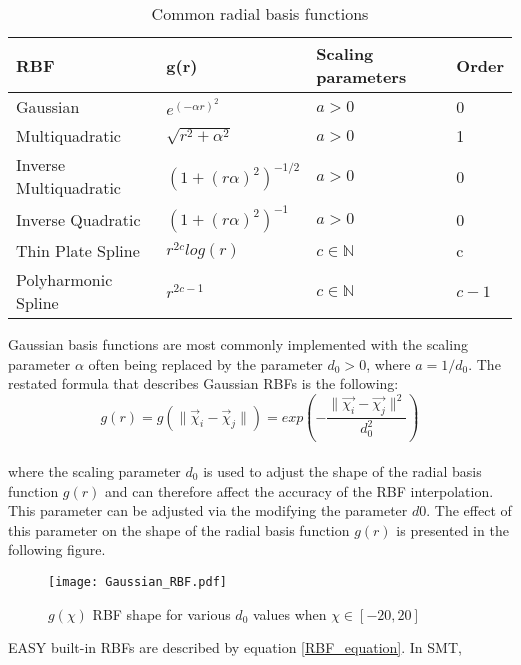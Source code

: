 \begin{table}[h!]
\centering
\begin{tabular}[c]{|p{4.1cm}|p{2.5cm}|p{2.5cm}|p{2.5cm}|}
\toprule
\rowcolor{gray!20} \textbf{RBF} & \textbf{g(r)} & 
\textbf{Scaling parameters}
& \textbf{Order} \\
\midrule
Gaussian & $e^{(-αr)^{2}}$ & $a > 0$ & 0 \\
Multiquadratic & $\sqrt{r^{2} + α^{2}}$ 
& $a > 0$ & 1 \\
Inverse Multiquadratic & $(1 + (rα)^{2})^{-1/2}$ 
& $a > 0$ & 0 \\
Inverse Quadratic & $(1 + (rα)^{2})^{-1}$ 
& $a > 0$ & 0 \\
Thin Plate Spline & $r^{2c}log(r)$
& $c \in \mathbb{N}$ & c \\
Polyharmonic Spline  & $r^{2c-1}$
& $c \in \mathbb{N}$ & $c-1$ \\
\bottomrule
\end{tabular}
\caption{Common radial basis functions}
\end{table}

Gaussian basis functions are most commonly implemented with the 
scaling parameter $α$ often being replaced by the parameter $d_{0} 
> 0$, where $a = 1/d_{0}$. The restated formula that describes 
Gaussian RBFs is the following:
\begin{equation}\label{d0}
g(r) = g \left( \lVert \vec{χ}_{i} - \vec{χ}_{j} \rVert 
\right) 
= exp \left( - \dfrac{\lVert \vec{χ_{i}} - \vec{χ_{j}}  
\rVert^{2}}{d_{0}^2} \right)
\end{equation}
\\[-2mm]
where the scaling parameter $d_{0}$ is used to adjust 
the shape of the radial basis function $g(r)$ and can 
therefore affect the accuracy of the RBF interpolation. This 
parameter can be adjusted via the modifying the parameter $d0$. 
The effect of this parameter on the shape of the radial basis
function $g(r)$ is presented in the following figure.

\begin{figure}[h!]
    \centering
    \texttt{[image: Gaussian\_RBF.pdf]}
    \caption{$g(χ)$ RBF shape for various $d_{0}$ values 
    when $χ \in [-20, 20]$}
\end{figure}

EASY built-in RBFs are described by equation \ref{RBF_equation}. In 
SMT,  
\newpage
